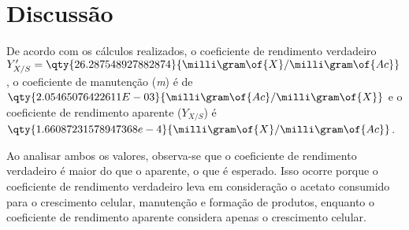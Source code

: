 \documentclass[\mainfilename]{subfiles}
\begin{document}
\begin{sectionBox}
\begin{center}
    \end{center}
    \section*{Discussão}
    De acordo com os cálculos realizados, o coeficiente de rendimento verdadeiro\\\(Y'_{X/S}=\qty{26.287548927882874}{\milli\gram\of{X}/\milli\gram\of{Ac}}\), o coeficiente de manutenção (\textit{m}) é de \(\qty{2.05465076422611E-03}{\milli\gram\of{Ac}/\milli\gram\of{X}}\) e o coeficiente de rendimento aparente (\(Y_{X/S}\)) é \(\qty{1.66087231578947368e-4}{\milli\gram\of{X}/\milli\gram\of{Ac}}\).\par
    Ao analisar ambos os valores, observa-se que o coeficiente de rendimento verdadeiro é maior do que o aparente, o que é esperado. Isso ocorre porque o coeficiente de rendimento verdadeiro leva em consideração o acetato consumido para o crescimento celular, manutenção e formação de produtos, enquanto o coeficiente de rendimento aparente considera apenas o crescimento celular.
\end{sectionBox}
\end{document}
